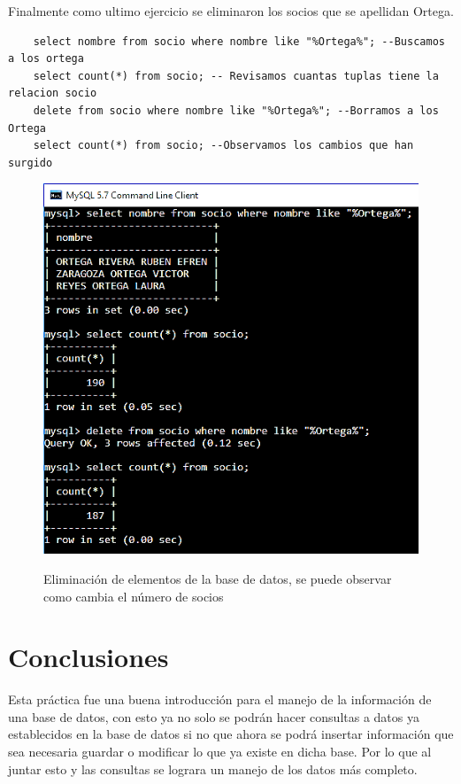\documentclass[12pt, titlepage]{article}
\begin{document}
	Finalmente como ultimo ejercicio se eliminaron los socios que se apellidan Ortega.
	\begin{lstlisting}
	select nombre from socio where nombre like "%Ortega%"; --Buscamos a los ortega
	select count(*) from socio; -- Revisamos cuantas tuplas tiene la relacion socio
	delete from socio where nombre like "%Ortega%"; --Borramos a los Ortega
	select count(*) from socio; --Observamos los cambios que han surgido
	\end{lstlisting}
	\begin{figure}[H]
		\begin{center}
			\includegraphics[width=\textwidth]{img/seis.png}
			\label{fig:seis}
			\caption{Eliminación de elementos de la base de datos, se puede observar como cambia el número de socios}
		\end{center}
	\end{figure}
	\section{Conclusiones}
	Esta práctica fue una buena introducción para el manejo de la información de una base de datos, con esto ya no solo se podrán hacer consultas a datos ya establecidos en la base de datos si no que ahora se podrá insertar información que sea necesaria guardar o modificar lo que ya existe en dicha base. Por lo que al juntar esto y las consultas se lograra un manejo de los datos más completo.
	 
	
\end{document}
